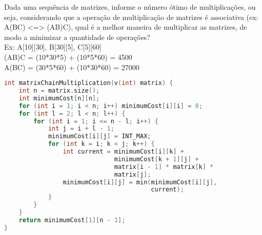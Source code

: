\large{
    Dada uma sequência de matrizes, informe o número ótimo de multiplicações, ou seja, considerando que a operação de multiplicação de matrizes é associativa (ex: A(BC) <=> (AB)C), qual é a melhor maneira de multiplicar as matrizes, de modo a minimizar a quantidade de operações?\\
    Ex: A[10][30], B[30][5], C[5][60]\\
        (AB)C = (10*30*5) + (10*5*60) = 4500\\
        A(BC) = (30*5*60) + (10*30*60) = 27000
}
\begin{lstlisting}[language=C++]
int matrixChainMultiplication(v(int) matrix) {
    int n = matrix.size();
    int minimumCost[n][n];
    for (int i = 1; i < n; i++) minimumCost[i][i] = 0;
    for (int l = 2; l < n; l++) {
        for (int i = 1; i <= n - l; i++) {
            int j = i + l - 1;
            minimumCost[i][j] = INT_MAX;
            for (int k = i; k < j; k++) {
                int current = minimumCost[i][k] + 
                              minimumCost[k + 1][j] + 
                              matrix[i - 1] * matrix[k] * 
                              matrix[j];
                minimumCost[i][j] = min(minimumCost[i][j],
                                        current);
            }
        }
    }
    return minimumCost[1][n - 1];
}
\end{lstlisting}